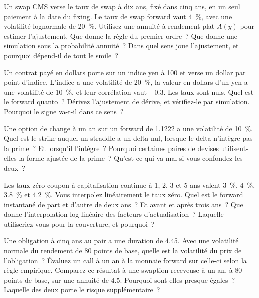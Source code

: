 \begin{question}\label{iq:iv2:rates-and-fx:42}
Un swap CMS verse le taux de swap à dix ans, fixé dans cinq ans, en un seul paiement à la date du fixing. Le taux de swap forward vaut 4~\%, avec une volatilité lognormale de 20~\%. Utilisez une annuité à rendement plat $A(y)$ pour estimer l'ajustement. Que donne la règle du premier ordre~? Que donne une simulation sous la probabilité annuité~? Dans quel sens joue l'ajustement, et pourquoi dépend-il de tout le smile~?
\end{question}

\begin{question}\label{iq:iv2:rates-and-fx:43}
Un contrat payé en dollars porte sur un indice yen à 100 et verse un dollar par point d'indice. L'indice a une volatilité de 20~\%, la valeur en dollars d'un yen a une volatilité de 10~\%, et leur corrélation vaut $-0.3$. Les taux sont nuls. Quel est le forward quanto~? Dérivez l'ajustement de dérive, et vérifiez-le par simulation. Pourquoi le signe va-t-il dans ce sens~?
\end{question}

\begin{question}\label{iq:iv2:rates-and-fx:44}
Une option de change à un an sur un forward de 1.1222 a une volatilité de 10~\%. Quel est le strike auquel un straddle a un delta nul, lorsque le delta n'intègre pas la prime~? Et lorsqu'il l'intègre~? Pourquoi certaines paires de devises utilisent-elles la forme ajustée de la prime~? Qu'est-ce qui va mal si vous confondez les deux~?
\end{question}

\begin{question}\label{iq:iv2:rates-and-fx:45}
Les taux zéro-coupon à capitalisation continue à 1, 2, 3 et 5 ans valent 3~\%, 4~\%, 3.8~\% et 4.2~\%. Vous interpolez linéairement le taux zéro. Quel est le forward instantané de part et d'autre de deux ans~? Et avant et après trois ans~? Que donne l'interpolation log-linéaire des facteurs d'actualisation~? Laquelle utiliseriez-vous pour la couverture, et pourquoi~?
\end{question}

\begin{question}\label{iq:iv2:rates-and-fx:46}
Une obligation à cinq ans au pair a une duration de 4.45. Avec une volatilité normale du rendement de 80 points de base, quelle est la volatilité du prix de l'obligation~? Évaluez un call à un an à la monnaie forward sur celle-ci selon la règle empirique. Comparez ce résultat à une swaption receveuse à un an, à 80 points de base, sur une annuité de 4.5. Pourquoi sont-elles presque égales~? Laquelle des deux porte le risque supplémentaire~?
\end{question}

